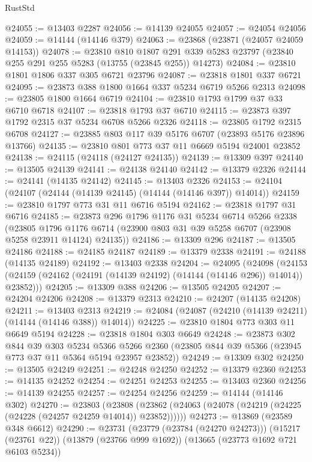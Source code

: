 \begin{lexlean}{RustStd}
\begin{coremodule}
@24055 := @13403 @2287
@24056 := @14139 @24055
@24057 := @24054 @24056
@24059 := @14144 (@14146 @379)
@24063 := @23868 (@23871 (@24057 @24059 @14153))
@24078 := @23810
    @810
    @1807
    @291
    @339
    @5283
    @23797
    (@23840 @255 @291 @255 @5283 (@13755 (@23845 @255)) @14273)
@24084 := @23810 @1801 @1806 @337 @305 @6721 @23796
@24087 := @23818 @1801 @337 @6721
@24095 := @23873 @388 @1800 @1664 @337 @5234 @6719 @5266 @2313
@24098 := @23805 @1800 @1664 @6719
@24104 := @23810 @1793 @1799 @37 @33 @6710 @6718
@24107 := @23818 @1793 @37 @6710
@24115 := @23873 @397 @1792 @2315 @37 @5234 @6708 @5266 @2326
@24118 := @23805 @1792 @2315 @6708
@24127 := @23885 @803 @117 @39 @5176 @6707 (@23893 @5176 @23896 @13766)
@24135 := @23810 @801 @773 @37 @11 @6669 @5194 @24001 @23852
@24138 := @24115 (@24118 (@24127 @24135))
@24139 := @13309 @397
@24140 := @13505 @24139
@24141 := @24138 @24140
@24142 := @13379 @2326
@24144 := @24141 (@14135 @24142)
@24145 := @13403 @2326
@24153 := @24104 (@24107 (@24144 (@14139 @24145) (@14144 (@14146 @397)) @14014))
@24159 := @23810 @1797 @773 @31 @11 @6716 @5194
@24162 := @23818 @1797 @31 @6716
@24185 := @23873
    @296
    @1796
    @1176
    @31
    @5234
    @6714
    @5266
    @2338
    (@23805 @1796 @1176 @6714 (@23900 @803 @31 @39 @5258 @6707 (@23908 @5258 @23911 @14124) @24135))
@24186 := @13309 @296
@24187 := @13505 @24186
@24188 := @24185 @24187
@24189 := @13379 @2338
@24191 := @24188 (@14135 @24189)
@24192 := @13403 @2338
@24204 := @24095
    (@24098
      (@24153 (@24159 (@24162 (@24191 (@14139 @24192) (@14144 (@14146 @296)) @14014)) @23852)))
@24205 := @13309 @388
@24206 := @13505 @24205
@24207 := @24204 @24206
@24208 := @13379 @2313
@24210 := @24207 (@14135 @24208)
@24211 := @13403 @2313
@24219 := @24084 (@24087 (@24210 (@14139 @24211) (@14144 (@14146 @388)) @14014))
@24225 := @23810 @1804 @773 @303 @11 @6649 @5194
@24228 := @23818 @1804 @303 @6649
@24248 := @23873
    @302
    @844
    @39
    @303
    @5234
    @5366
    @5266
    @2360
    (@23805 @844 @39 @5366 (@23945 @773 @37 @11 @5364 @5194 @23957 @23852))
@24249 := @13309 @302
@24250 := @13505 @24249
@24251 := @24248 @24250
@24252 := @13379 @2360
@24253 := @14135 @24252
@24254 := @24251 @24253
@24255 := @13403 @2360
@24256 := @14139 @24255
@24257 := @24254 @24256
@24259 := @14144 (@14146 @302)
@24270 := @23803
    (@23808 (@23862 (@24063 (@24078 (@24219 (@24225 (@24228 (@24257 @24259 @14014)) @23852))))))
@24273 := @13869 (@23589 @348 @6612)
@24290 := @23731
    (@23779 (@23784 (@24270 @24273)))
    (@15217 (@23761 @22))
    (@13879 (@23766 @999 @1692))
    (@13665 (@23773 @1692 @721 @6103 @5234))

\end{coremodule}
\end{lexlean}

